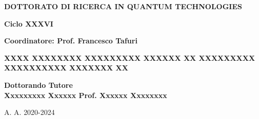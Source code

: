 \documentclass[11pt,oneside]{amsart}
\begin{document}
\begin{titlepage}
\begin{center}
\textbf {\LARGE{D}\large{OTTORATO DI} \LARGE{R}\small{ICERCA IN} \LARGE{Q}\large{UANTUM} \LARGE{T}\large{ECHNOLOGIES}}

\vspace{.5 cm}

{\Large{\bfseries Ciclo XXXVI}}

\vspace{.5 cm}

{\Large{\bfseries Coordinatore: Prof. Francesco Tafuri}}

\vspace{1.5 cm}

{\LARGE{\bfseries{
{XXXX XXXXXXXX XXXXXXXXX XXXXXX XX XXXXXXXXX XXXXXXXXXX XXXXXXX XX}
}}}

\vspace{1.5 cm}


\vspace{0.8 cm}

\begin{flushleft}

\hspace{3 cm} \bfseries Dottorando  \hspace{6.5 cm} \bfseries Tutore\\
\vspace{6pt}\hspace{3 cm} Xxxxxxxxx Xxxxxx \hspace{5.45 cm} Prof. Xxxxxx Xxxxxxxx \\
\vspace{6pt}\hspace{11.8 cm}

\end{flushleft}
\vspace{0.8cm}

{\Large A. A.} {\Large 2020-2024}
\end{center}
\end{titlepage}
\end{document}
